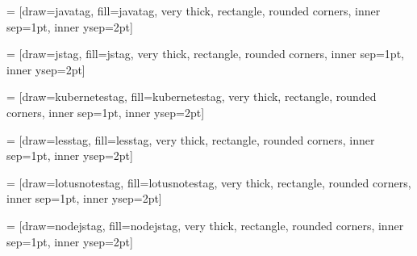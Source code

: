  = [draw=javatag, fill=javatag, very thick, rectangle, rounded corners, inner sep=1pt, inner ysep=2pt]
\newcommand{\javatag}{\begin{tikzpicture}\node [javatag] (box){{\scriptsize \textbf{\phantom{|}Java\phantom{|}}}};\end{tikzpicture}}
\usepackage{tikz}
    
 = [draw=jstag, fill=jstag, very thick, rectangle, rounded corners, inner sep=1pt, inner ysep=2pt]
\newcommand{\jstag}{\begin{tikzpicture}\node [jstag] (box){{\scriptsize \color{darkgray}{\textbf{\phantom{|}JS\phantom{|}}}}};\end{tikzpicture}}
\usepackage{tikz}
    
 = [draw=kubernetestag, fill=kubernetestag, very thick, rectangle, rounded corners, inner sep=1pt, inner ysep=2pt]
\newcommand{\kubernetestag}{\begin{tikzpicture}\node [kubernetestag] (box){{\scriptsize \color{white}{\textbf{\phantom{|}Kubernetes\phantom{|}}}}};\end{tikzpicture}}
\usepackage{tikz}
    
 = [draw=lesstag, fill=lesstag, very thick, rectangle, rounded corners, inner sep=1pt, inner ysep=2pt]
\newcommand{\lesstag}{\begin{tikzpicture}\node [lesstag] (box){{\scriptsize \color{white}{\textbf{\phantom{|}LESS\phantom{|}}}}};\end{tikzpicture}}
\usepackage{tikz}
    
 = [draw=lotusnotestag, fill=lotusnotestag, very thick, rectangle, rounded corners, inner sep=1pt, inner ysep=2pt]
\newcommand{\lotusnotestag}{\begin{tikzpicture}\node [lotusnotestag] (box){{\scriptsize \textbf{\phantom{|}Lotus Notes\phantom{|}}}};\end{tikzpicture}}
\usepackage{tikz}
    
 = [draw=nodejstag, fill=nodejstag, very thick, rectangle, rounded corners, inner sep=1pt, inner ysep=2pt]
\newcommand{\nodejstag}{\begin{tikzpicture}\node [nodejstag] (box){{\scriptsize \color{white}{\textbf{\phantom{|}Node.js\phantom{|}}}}};\end{tikzpicture}}
\usepackage{tikz}
    
